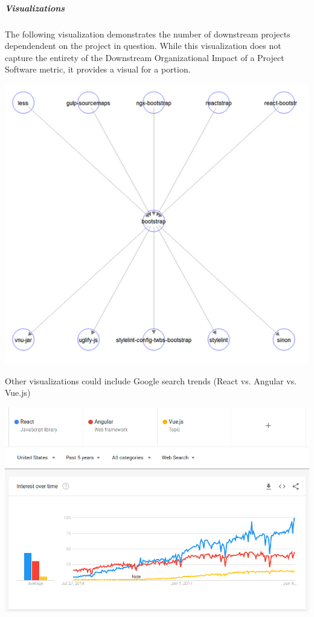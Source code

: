 \hypertarget{visualizations}{%
\subparagraph{Visualizations}\label{visualizations}}

The following visualization demonstrates the number of downstream
projects dependendent on the project in question. While this
visualization does not capture the entirety of the Downstream
Organizational Impact of a Project Software metric, it provides a visual
for a portion.

\includegraphics{images/organizational-project-skill-demand_paper.png}

Other visualizations could include Google search trends (React vs.
Angular vs. Vue.js)

\includegraphics{images/organizational-project-skill-demand_google-trends.png}

